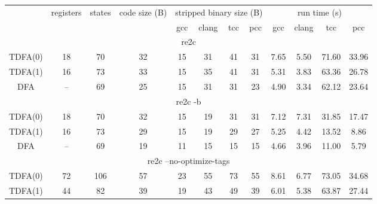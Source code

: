 \documentclass{article}
\theoremstyle{definition}
\begin{document}
\begin{multicols}{2}
\begin{table}\label{table2}
\begin{center}
    \begin{tabular}{|c|ccccccccccc|}
    \hline
    & registers & states & code size (B) & \multicolumn{4}{c}{stripped binary size (B)} & \multicolumn{4}{c|}{run time (s)} \\
    & & &
        & gcc & clang & tcc & pcc
        & gcc & clang & tcc & pcc \\
    \hline \hline
    \multicolumn{12}{|c|}{re2c} \\
    \hline
    TDFA(0) & 18 & 70 & 32 & 15 & 31 & 41 & 31 & 7.65 & 5.50 & 71.60 & 33.96 \\
    TDFA(1) & 16 & 73 & 33 & 15 & 35 & 41 & 31 & 5.31 & 3.83 & 63.36 & 26.78 \\
    DFA     & -- & 69 & 25 & 15 & 31 & 31 & 23 & 4.90 & 3.34 & 62.12 & 23.64 \\
    \hline \hline
    \multicolumn{12}{|c|}{re2c -b} \\
    \hline
    TDFA(0) & 18 & 70 & 32 & 15 & 19 & 31 & 31 & 7.12 & 7.31 & 31.85 & 17.47 \\
    TDFA(1) & 16 & 73 & 29 & 15 & 19 & 29 & 27 & 5.25 & 4.42 & 13.52 &  8.86 \\
    DFA     & -- & 69 & 19 & 11 & 15 & 15 & 15 & 4.66 & 3.96 & 11.00 &  5.79 \\
    \hline \hline
    \multicolumn{12}{|c|}{re2c --no-optimize-tags} \\
    \hline
    TDFA(0) & 72 & 106 & 57 & 23 & 55 & 73 & 55 & 8.61 & 6.77 & 73.05 & 34.68 \\
    TDFA(1) & 44 &  82 & 39 & 19 & 43 & 49 & 39 & 6.01 & 5.38 & 63.87 & 27.44 \\

\end{tabular}
\end{center}
\end{table}
\end{multicols}
\end{document}
